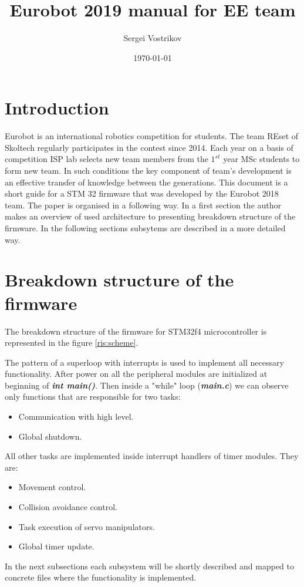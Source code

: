 \documentclass[a4paper,12pt]{article} %
\author{Sergei Vostrikov}
\title{Eurobot 2019 manual for EE team}
\date{\today}
\begin{document}

\maketitle

\newpage
\section*{Introduction}
Eurobot is an international robotics competition for students. The team REset of Skoltech regularly participates in the contest since 2014. Each year on a basis of competition ISP lab selects new team members from the $1^{st}$ year MSc students to form new team. In such conditions the key component of team's development is an effective transfer of knowledge between the generations. This document is a short guide for a STM 32 firmware that was developed by the Eurobot 2018 team. The paper is organised in a following way. In a first section the author makes an overview of used architecture to presenting breakdown structure of the firmware. In the following sections subsytems are described in a more detailed way.

\section{Breakdown structure of the firmware}
The breakdown structure of the firmware for STM32f4 microcontroller is represented in the figure \ref{ris:scheme}. 

The pattern of a superloop with interrupts is used to implement all necessary functionality. After power on all the peripheral modules are initialized at beginning of \textbf{\textit{int main()}}. Then inside a "while" loop (\textbf{\textit{main.c}}) we can observe only functions that are responsible for two tasks:
\begin{itemize}
	\item Communication with high level.
	\item Global shutdown.
\end{itemize}
All other tasks are implemented inside interrupt handlers of timer modules. They are:
\begin{itemize}
	\item Movement control.
	\item Collision avoidance control.
	\item Task execution of servo manipulators.
	\item Global timer update.
\end{itemize}
In the next subsections each subsystem will be shortly described and mapped to concrete files where the functionality is implemented.
\end{document}
